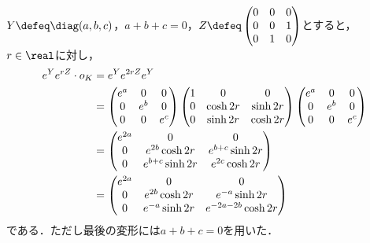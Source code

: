 \begin{npfwn}
  $Y \defeq \diag(a,b,c)  $，$a + b + c = 0$，$Z \defeq
  \begin{pmatrix}
    0 & 0 & 0\\
    0 & 0 & 1\\
    0 & 1 & 0
  \end{pmatrix}
  $とすると，$r\in \real$に対し，
  \begin{align}
    e^{Y}e^{rZ}\cdot o_K &= e^{Y}e^{2rZ}e^{Y}\notag\\
                         &=
                           \begin{pmatrix}
                             e^{a} & 0 & 0 \\
                             0 & e^{b} & 0\\
                             0 & 0 & e^{c}
                           \end{pmatrix}
                                     \begin{pmatrix}
                                       1 & 0 & 0\\
                                       0 & \cosh 2r & \sinh 2r \\
                                       0 & \sinh 2r & \cosh 2r
                                     \end{pmatrix}
                                                      \begin{pmatrix}
                                                        e^{a} & 0 & 0 \\
                                                        0 & e^{b} & 0\\
                                                        0 & 0 & e^{c}
                                                      \end{pmatrix}\notag\\
                         &=
                           \begin{pmatrix}
                             e^{2a} & 0 & 0\\
                             0 & e^{2b}\cosh 2r & e^{b+c}\sinh 2r \\
                             0 & e^{b+c}\sinh 2r & e^{2c}\cosh 2r
                           \end{pmatrix}\notag\\
                         &= \begin{pmatrix}
                             e^{2a} & 0 & 0\\
                             0 & e^{2b}\cosh 2r & e^{-a}\sinh 2r \\
                             0 & e^{-a}\sinh 2r & e^{-2a-2b}\cosh 2r
                           \end{pmatrix}\label{eq:0114-2}
  \end{align}
  である．ただし最後の変形には$a + b + c = 0$を用いた．


\end{npfwn}
